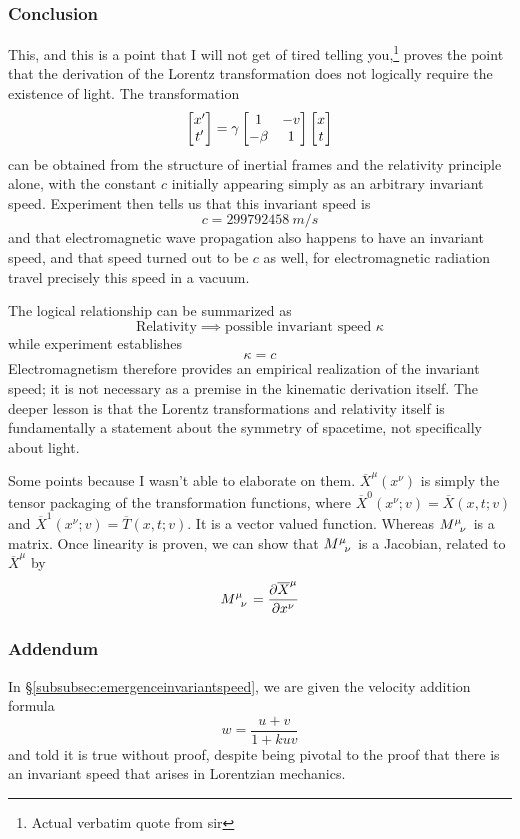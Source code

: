 	\subsubsection{Conclusion}
		This, and this is a point that I will not get of tired telling you,\footnote{Actual verbatim quote from sir}
		proves the point that the derivation of the Lorentz transformation does not logically require 
		the existence of light. The transformation
		\[
			\bmqty{
		    	x'\\t'
		    } =
			\gamma
			\bmqty{
				1 & -v \\
				-\beta & 1
			} \bmqty{
				x\\t	
			} 
		\]
		can be obtained from the structure of inertial frames and the relativity principle alone, 
		with the constant $c$ initially appearing simply as an arbitrary invariant speed. Experiment
		then tells us that this invariant speed is 
		\begin{equation}
			c = \SI{299792458}{m/s}
		\end{equation}
		and that electromagnetic wave propagation also happens to have an invariant speed, and that speed turned out
		to be $c$ as well, for electromagnetic radiation travel precisely this speed in a vacuum.

		The logical relationship can be summarized as 
		\[
			\text{Relativity}\implies\text{possible invariant speed } \kappa
		\]
		while experiment establishes
		\[
			\kappa = c
		\]
		Electromagnetism therefore provides an empirical realization of the invariant speed; 
		it is not necessary as a premise in the kinematic derivation itself.
		The deeper lesson is that the Lorentz transformations and relativity itself is fundamentally a statement about 
		the symmetry of spacetime, not specifically about light.
		\begin{remark}
			Some points because I wasn't able to elaborate on them. $\overline{X}^\mu(x^\nu)$ is simply 
			the tensor packaging of the transformation functions, where $\overline{X}^0(x^\nu;v) = \overline{X}(x,t;v)$
			and $\overline{X}^1(x^\nu;v) = \overline{T}(x,t;v)$. It is a vector valued function. Whereas $\tensor{M}{^\mu_\nu}$
			is a matrix. Once linearity is proven, we can show that $\tensor{M}{^\mu_\nu}$ is a Jacobian, related to $\overline{X}^\mu$
			by
			\[
				\tensor{M}{^\mu_\nu} = \pdv{\overline{X}^\mu}{x^\nu} 
			\]
		\end{remark}	
		\newpage
		\subsubsection*{Addendum}
			In \S \ref{subsubsec:emergenceinvariantspeed}, we are given the velocity addition formula
			\[
				w = \frac{u+v}{1+kuv}
			\]
			and told it is true without proof, despite being pivotal to the proof that there is
			an invariant speed that arises in Lorentzian mechanics.

